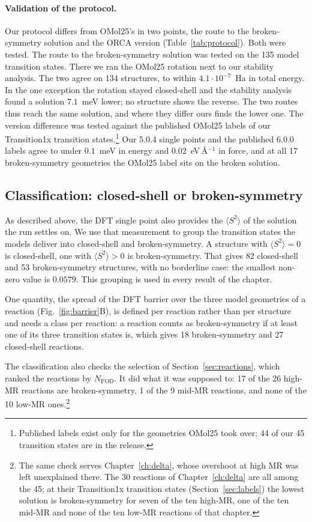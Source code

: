 \paragraph{Validation of the protocol.} Our protocol differs from
OMol25's in two points, the route to the broken-symmetry solution and
the ORCA version (Table~\ref{tab:protocol}). Both were tested.
The route to the broken-symmetry solution was tested on the 135 model
transition states. There we ran
the OMol25 rotation next to our stability analysis. The two agree on
134 structures, to within $4.1\cdot10^{-7}$~Ha in total energy. In the
one exception the rotation stayed closed-shell and the stability
analysis found a solution $7.1$~meV lower; no structure shows the
reverse. The two routes thus reach the same solution, and where they
differ ours finds the lower one. The version difference was tested against the published OMol25
labels of our Transition1x transition states.\footnote{Published
labels exist only for the geometries OMol25 took over; 44 of our 45
transition states are in the release.} Our 5.0.4 single points and
the published 6.0.0 labels agree to under $0.1$~meV in energy and
$0.02$~eV\,\AA$^{-1}$ in force, and at all 17 broken-symmetry
geometries the OMol25 label sits on the broken solution.


\subsection{Classification: closed-shell or broken-symmetry}
\label{sec:classification}

As described above, the DFT single point also provides the
$\langle S^2\rangle$ of the solution the run settles on. We use that
measurement to group the transition states the models deliver into
closed-shell and broken-symmetry. A structure with $\langle S^2\rangle = 0$ is
closed-shell, one with $\langle S^2\rangle > 0$ is broken-symmetry. That
gives 82 closed-shell and 53 broken-symmetry structures, with no
borderline case: the smallest non-zero value is $0.0579$. This
grouping is used in every result of the chapter.

One quantity, the spread of the DFT barrier over the three model
geometries of a reaction (Fig.~\ref{fig:barrier}B), is defined per
reaction rather than per structure and needs a class per reaction: a
reaction counts as broken-symmetry if at least one of its three
transition states is, which gives 18 broken-symmetry and 27
closed-shell reactions.

The classification also checks the selection of
Section~\ref{sec:reactions}, which ranked the reactions by
$N_\mathrm{FOD}$. It did what it was supposed to: 17 of the 26 high-MR reactions are broken-symmetry, 1 of
the 9 mid-MR reactions, and none of the 10 low-MR
ones.\footnote{The same check serves Chapter~\ref{ch:delta}, whose
overshoot at high MR was left unexplained there. The 30 reactions of
Chapter~\ref{ch:delta} are all among the 45; at their Transition1x
transition states (Section~\ref{sec:labels}) the lowest solution is
broken-symmetry for seven of the ten high-MR, one of the ten mid-MR
and none of the ten low-MR reactions of that chapter.}

